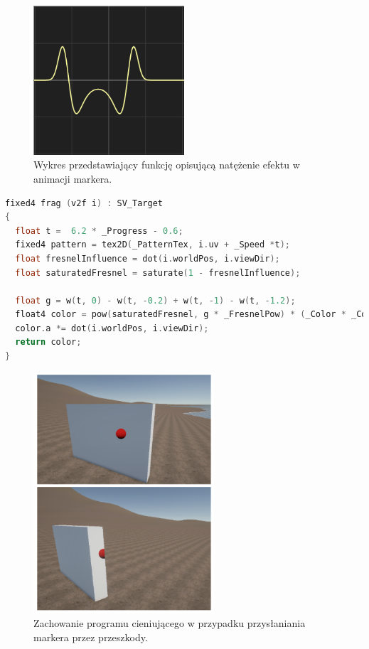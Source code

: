 \begin{figure}[h]
    \centering
    \includegraphics[width=0.5\textwidth]{images/g}
    \caption{Wykres przedstawiający funkcję opisującą natężenie efektu w animacji markera.}
\end{figure}



\begin{lstlisting}[language=C++, caption=Fragment shadera odpowiedzialny za animację.]
fixed4 frag (v2f i) : SV_Target
{
  float t =  6.2 * _Progress - 0.6;
  fixed4 pattern = tex2D(_PatternTex, i.uv + _Speed *t);
  float fresnelInfluence = dot(i.worldPos, i.viewDir);
  float saturatedFresnel = saturate(1 - fresnelInfluence);

  float g = w(t, 0) - w(t, -0.2) + w(t, -1) - w(t, -1.2);
  float4 color = pow(saturatedFresnel, g * _FresnelPow) * (_Color * _ColorIntensity) * pattern;
  color.a *= dot(i.worldPos, i.viewDir);
  return color;
}
\end{lstlisting}

\begin{figure}[h]
\centering
\includegraphics[width=0.6\textwidth]{images/shader}
\caption{Zachowanie programu cieniującego w przypadku przysłaniania markera przez przeszkody.}
\end{figure}
